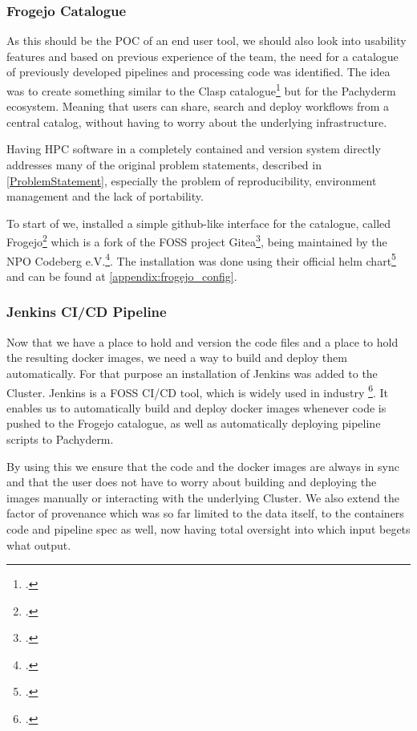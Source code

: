 \subsubsection{Frogejo Catalogue}

As this should be the \ac{POC} of an end user tool, we should also look into usability features and based on previous experience of the team,
the need for a catalogue of previously developed pipelines and processing code was identified.
The idea was to create something similar to the Clasp catalogue\footcite{sayersCLoudApplicationServices2015} but for the Pachyderm ecosystem.
Meaning that users can share, search and deploy workflows from a central catalog, without having to worry about the underlying infrastructure.

Having \ac{HPC} software in a completely contained and version system directly addresses many of the original problem statements,
described in \ref{ProblemStatement}, especially the problem of reproducibility, environment management and the lack of portability.

To start of we, installed a simple github-like interface for the catalogue, called Frogejo\footcite{forgejoForgejo} which is a fork of the \ac{FOSS} project Gitea\footcite{GiteaGitCup2023},
being maintained by the \ac{NPO} Codeberg e.V.\footcite{codebergCodebergOrg}.
The installation was done using their official helm chart\footcite{Forgejo13Forgejo} and can be found at \ref{appendix:frogejo_config}.

\subsubsection{Jenkins CI/CD Pipeline}

Now that we have a place to hold and version the code files and a place to hold the resulting docker images, we need a way to build and deploy them automatically.
For that purpose an installation of Jenkins was added to the Cluster. Jenkins is a \ac{FOSS} \ac{CI/CD} tool, which is widely used in industry \footcite{JenkinsMarketShare}.
It enables us to automatically build and deploy docker images whenever code is pushed to the Frogejo catalogue, as well as automatically deploying pipeline scripts to Pachyderm.

By using this we ensure that the code and the docker images are always in sync and that the user does not have to worry about building and deploying the images manually or interacting with the underlying Cluster.
We also extend the factor of provenance which was so far limited to the data itself, to the containers code and pipeline spec as well, now having total oversight into which input begets what output.

